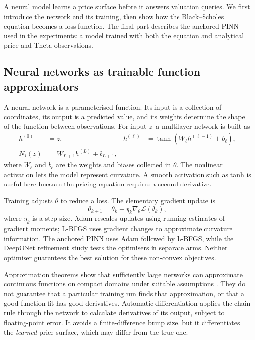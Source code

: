 \documentclass[11pt,a4paper]{article}
\begin{document}
A neural model learns a price surface before it answers valuation queries. We first introduce the network and its training, then show how the Black--Scholes equation becomes a loss function. The final part describes the anchored PINN used in the experiments: a model trained with both the equation and analytical price and Theta observations.

\subsection{Neural networks as trainable function approximators}
\label{sec:pinn-nn}
A neural network is a parameterised function. Its input is a collection of coordinates, its output is a predicted value, and its weights determine the shape of the function between observations. For input $z$, a multilayer network is built as
\begin{align}
h^{(0)}&=z, &h^{(\ell)}&=\tanh\!\left(W_\ell h^{(\ell-1)}+b_\ell\right),\\
N_\theta(z)&=W_{L+1}h^{(L)}+b_{L+1},
\label{eq:mlp}
\end{align}
where $W_\ell$ and $b_\ell$ are the weights and biases collected in $\theta$. The nonlinear activation lets the model represent curvature. A smooth activation such as tanh is useful here because the pricing equation requires a second derivative.

Training adjusts $\theta$ to reduce a loss. The elementary gradient update is
\begin{equation}
\theta_{k+1}=\theta_k-\eta_k\nabla_\theta\mathcal L(\theta_k),
\end{equation}
where $\eta_k$ is a step size. Adam rescales updates using running estimates of gradient moments; L-BFGS uses gradient changes to approximate curvature information. The anchored PINN uses Adam followed by L-BFGS, while the DeepONet refinement study tests the optimisers in separate arms. Neither optimiser guarantees the best solution for these non-convex objectives.

Approximation theorems show that sufficiently large networks can approximate continuous functions on compact domains under suitable assumptions \cite{cybenko1989,hornik1989}. They do not guarantee that a particular training run finds that approximation, or that a good function fit has good derivatives. Automatic differentiation applies the chain rule through the network to calculate derivatives of its output, subject to floating-point error. It avoids a finite-difference bump size, but it differentiates the \emph{learned} price surface, which may differ from the true one.
\end{document}
